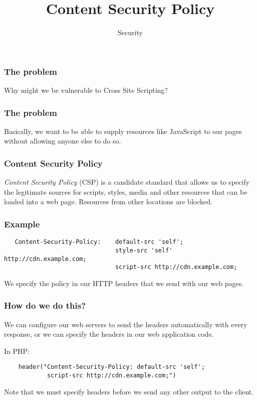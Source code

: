 \documentclass[10pt]{beamer}
\title{Content Security Policy}
\author[IN618]{Security}
\institute[Otago Polytechnic]{
  Otago Polytechnic \\
  Dunedin, New Zealand \\
}
\date{}
\begin{document}
\begin{frame}[plain]
  \titlepage
\end{frame}


\begin{frame}
	\frametitle{The problem}
	
	Why might we be vulnerable to Cross Site Scripting?
	
\end{frame}

\begin{frame}
	\frametitle{The problem}
	
	Basically, we want to be able to supply resources like JavaScript 
	to our pages without allowing anyone else to do so.
	
	
\end{frame}

\begin{frame}
	\frametitle{Content Security Policy}

	\emph{Content Security Policy} (CSP) is a candidate standard that allows us to 
	specify the legitimate sources for scripts, styles, media and other resources that
	can be loaded into a web page. Resources from other locations are blocked.
	 
\end{frame}
\begin{frame}[fragile]
	\frametitle{Example}

	\begin{verbatim}
   Content-Security-Policy:    default-src 'self'; 
                               style-src 'self' http://cdn.example.com; 
                               script-src http://cdn.example.com;
	\end{verbatim}
	
	We specify the policy in our HTTP headers that we send with our web pages.
	
\end{frame}

\begin{frame}[fragile]
	\frametitle{How do we do this?}
	
	We can configure our web servers to send the headers automatically with every response, or
	we can specify the headers in our web application code.
	
	In PHP:
	\begin{verbatim}
	header("Content-Security-Policy: default-src 'self'; 
	        script-src http://cdn.example.com;")
	\end{verbatim}
	
	Note that we must specify headers before we send any other output to the client.
	
\end{frame}
\end{document}
